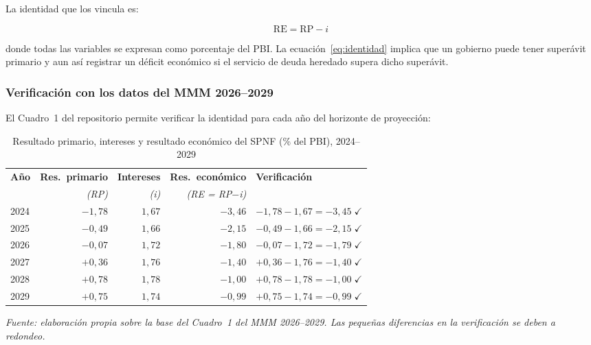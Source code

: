 \documentclass[12pt, a4paper]{article}
\newcommand{\nota}[1]{\textit{\small #1}}
\begin{document}
La identidad que los vincula es:

\begin{equation}
    \boxed{\mathrm{RE} = \mathrm{RP} - i}
    \label{eq:identidad}
\end{equation}

\noindent donde todas las variables se expresan como porcentaje del PBI.
La ecuación~\eqref{eq:identidad} implica que un gobierno puede tener superávit
primario y aun así registrar un déficit económico si el servicio de deuda
heredado supera dicho superávit.

\subsubsection*{Verificación con los datos del MMM 2026--2029}

El Cuadro~1 del repositorio permite verificar la identidad para cada año del
horizonte de proyección:

\begin{table}[h!]
\centering
\caption{Resultado primario, intereses y resultado económico del SPNF
         (\% del PBI), 2024--2029}
\label{tab:aritmetica}
\setlength{\tabcolsep}{9pt}
\renewcommand{\arraystretch}{1.25}
\begin{tabular}{lrrrl}
\toprule
\rowcolor{headgray}
\textbf{Año} &
\textbf{Res.\ primario} &
\textbf{Intereses} &
\textbf{Res.\ económico} &
\textbf{Verificación} \\
 & \textit{(RP)} & \textit{(i)} & \textit{(RE = RP$-$i)} & \\
\midrule
2024 & $-1{,}78$ & $1{,}67$ & $-3{,}46$ & $-1{,}78 - 1{,}67 = -3{,}45\;\checkmark$ \\
\rowcolor{rowgray}
2025 & $-0{,}49$ & $1{,}66$ & $-2{,}15$ & $-0{,}49 - 1{,}66 = -2{,}15\;\checkmark$ \\
2026 & $-0{,}07$ & $1{,}72$ & $-1{,}80$ & $-0{,}07 - 1{,}72 = -1{,}79\;\checkmark$ \\
\rowcolor{rowgray}
2027 & $+0{,}36$ & $1{,}76$ & $-1{,}40$ & $+0{,}36 - 1{,}76 = -1{,}40\;\checkmark$ \\
2028 & $+0{,}78$ & $1{,}78$ & $-1{,}00$ & $+0{,}78 - 1{,}78 = -1{,}00\;\checkmark$ \\
\rowcolor{rowgray}
2029 & $+0{,}75$ & $1{,}74$ & $-0{,}99$ & $+0{,}75 - 1{,}74 = -0{,}99\;\checkmark$ \\
\bottomrule
\end{tabular}
\smallskip

\nota{Fuente: elaboración propia sobre la base del Cuadro~1 del MMM 2026--2029.
Las pequeñas diferencias en la verificación se deben a redondeo.}
\end{table}
\end{document}
